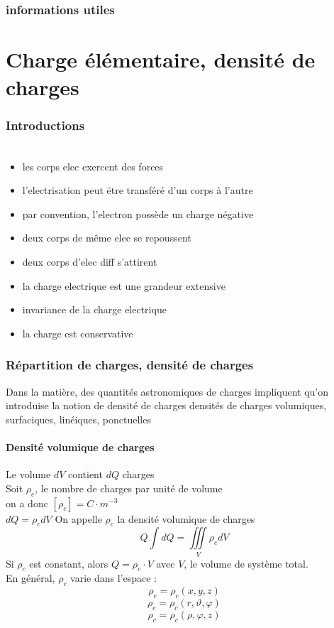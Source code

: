 \documentclass[../main.tex]{subfile}
\begin{document}
\section{informations utiles}
\part{Charge élémentaire, densité de charges}

\section{Introductions}
\begin{prop}
$\phantom{a}$
\begin{itemize}
	\item les corps elec exercent des forces
	\item l'electrisation peut ëtre transféré d'un corps à l'autre
	\item par convention, l'electron possède un charge négative
	\item deux corps de même elec se repoussent 
	\item deux corps d'elec diff s'attirent
	\item la charge electrique est une grandeur extensive
	\item invariance de la charge electrique
	\item la charge est conservative
\end{itemize}
\end{prop}

\section{Répartition de charges, densité de charges}
Dans la matière, des quantités astronomiques de charges impliquent qu'on introduise la notion de densité de charges
densités de charges volumiques, surfaciques, linéiques, ponctuelles

\subsection{Densité volumique de charges}
Le volume $dV$ contient $dQ$ charges\\
Soit $\rho_c$, le nombre de charges par unité de volume\\
on a donc $[\rho_c] = C \cdot m^{-3}$\\
$dQ = \rho_cdV$
On appelle $\rho_c$ la densité volumique de charges\\
$$Q \int dQ = \iiint\limits_V \rho_cdV$$
Si $\rho_c$ est constant, alors $Q = \rho_c \cdot V$ avec $V$, le volume de système total.\\
En général, $\rho_c$ varie dans l'espace :\\
$$\rho_c = \rho_c(x, y, z)$$
$$\rho_c = \rho_c(r, \vartheta, \varphi)$$
$$\rho_c = \rho_c(\rho, \varphi, z)$$
\end{document}

